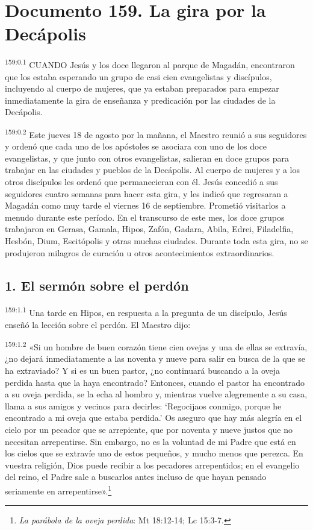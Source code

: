 \chapter{Documento 159. La gira por la Decápolis}
\par 
\textsuperscript{159:0.1} CUANDO Jesús y los doce llegaron al parque de Magadán, encontraron que los estaba esperando un grupo de casi cien evangelistas y discípulos, incluyendo al cuerpo de mujeres, que ya estaban preparados para empezar inmediatamente la gira de enseñanza y predicación por las ciudades de la Decápolis.

\par 
\textsuperscript{159:0.2} Este jueves 18 de agosto por la mañana, el Maestro reunió a sus seguidores y ordenó que cada uno de los apóstoles se asociara con uno de los doce evangelistas, y que junto con otros evangelistas, salieran en doce grupos para trabajar en las ciudades y pueblos de la Decápolis. Al cuerpo de mujeres y a los otros discípulos les ordenó que permanecieran con él. Jesús concedió a sus seguidores cuatro semanas para hacer esta gira, y les indicó que regresaran a Magadán como muy tarde el viernes 16 de septiembre. Prometió visitarlos a menudo durante este período. En el transcurso de este mes, los doce grupos trabajaron en Gerasa, Gamala, Hipos, Zafón, Gadara, Abila, Edrei, Filadelfia, Hesbón, Dium, Escitópolis y otras muchas ciudades. Durante toda esta gira, no se produjeron milagros de curación u otros acontecimientos extraordinarios.

\section*{1. El sermón sobre el perdón}
\par 
\textsuperscript{159:1.1} Una tarde en Hipos, en respuesta a la pregunta de un discípulo, Jesús enseñó la lección sobre el perdón. El Maestro dijo:

\par 
\textsuperscript{159:1.2} «Si un hombre de buen corazón tiene cien ovejas y una de ellas se extravía, ¿no dejará inmediatamente a las noventa y nueve para salir en busca de la que se ha extraviado? Y si es un buen pastor, ¿no continuará buscando a la oveja perdida hasta que la haya encontrado? Entonces, cuando el pastor ha encontrado a su oveja perdida, se la echa al hombro y, mientras vuelve alegremente a su casa, llama a sus amigos y vecinos para decirles: `Regocijaos conmigo, porque he encontrado a mi oveja que estaba perdida.' Os aseguro que hay más alegría en el cielo por un pecador que se arrepiente, que por noventa y nueve justos que no necesitan arrepentirse. Sin embargo, no es la voluntad de mi Padre que está en los cielos que se extravíe uno de estos pequeños, y mucho menos que perezca. En vuestra religión, Dios puede recibir a los pecadores arrepentidos; en el evangelio del reino, el Padre sale a buscarlos antes incluso de que hayan pensado seriamente en arrepentirse».\footnote{\textit{La parábola de la oveja perdida}: Mt 18:12-14; Lc 15:3-7.}

